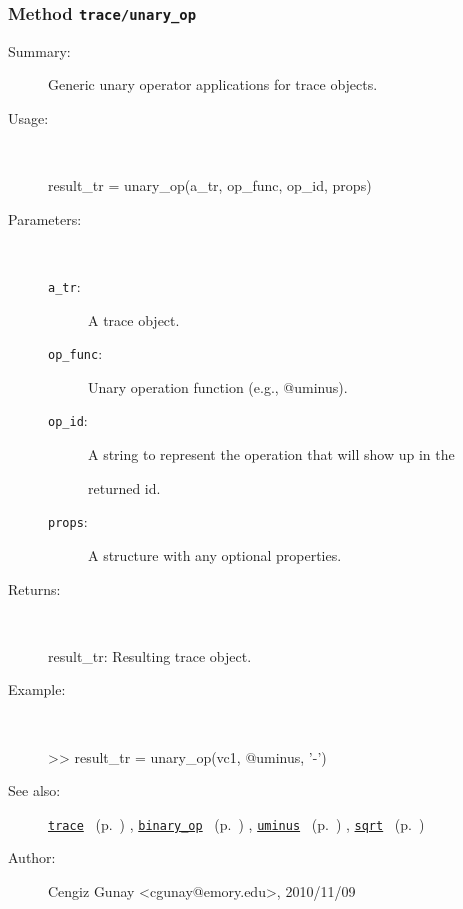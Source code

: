 \subsubsection[Method \texttt{unary\_op}]{Method \texttt{trace/unary\_op}}%
%
\label{ref_trace__unary_op}%
\hypertarget{ref_trace__unary_op}{}%
\begin{description}
\item[Summary:]Generic unary operator applications for trace objects.
%
\item[Usage:]~%
\begin{lyxcode}%
result\_tr = unary\_op(a\_tr, op\_func, op\_id, props)
%
\end{lyxcode}%
%
%
\item[Parameters:]~
\begin{description}%
\item[\texttt{a\_tr}:]
 A trace object.
\item[\texttt{op\_func}:]
 Unary operation function (e.g., @uminus).
\item[\texttt{op\_id}:]
 A string to represent the operation that will show up in the

returned id.
\item[\texttt{props}:]
 A structure with any optional properties.
\end{description}%
%
\item[Returns:
]~

   result\_tr: Resulting trace object.
%
\item[Example:]~
\begin{lyxcode} >> result\_tr = unary\_op(vc1, @uminus, '-')
\\%
\end{lyxcode}
%
\item[See also:]%
\hyperlink{ref_trace}{\texttt{trace}}%
\ (p.~\pageref{ref_trace})%
%
, \hyperlink{ref_binary_op}{\texttt{binary\_op}}%
\ (p.~\pageref{ref_binary_op})%
%
, \hyperlink{ref_uminus}{\texttt{uminus}}%
\ (p.~\pageref{ref_uminus})%
%
, \hyperlink{ref_sqrt}{\texttt{sqrt}}%
\ (p.~\pageref{ref_sqrt})%
%
%
\item[Author:]%
Cengiz Gunay <cgunay@emory.edu>, 2010/11/09
%
\end{description}
\methodline%
